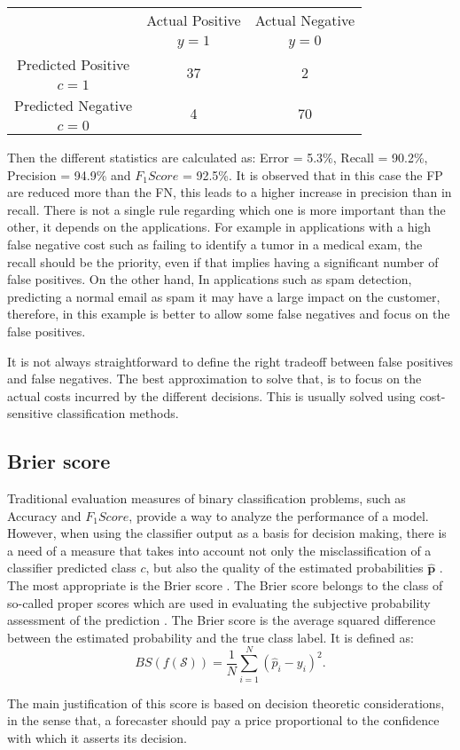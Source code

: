 \begin{center}
		\footnotesize
    \begin{tabular}{c|c|c}
			\multicolumn{1}{c|}{}  & Actual Positive& Actual Negative \\
			\multicolumn{1}{c|}{} & $y=1$& $y=0$ \\
			\hline
			Predicted Positive 		& \multirow{ 2}{*}{37} & \multirow{ 
			2}{*}{2} \\
			$c=1$ & &\\
			\hline
			Predicted Negative  	& \multirow{ 2}{*}{4} & \multirow{ 
			2}{*}{70} \\
			$c=0$ & &\\
		\end{tabular}
\end{center}
Then the different statistics are calculated as: Error = 5.3\%, Recall = 90.2\%, Precision = 
94.9\% and $F_1Score$ = 92.5\%.
It is observed that in this case the FP are reduced more than the FN, this leads to a higher 
increase in precision  than in recall. There is not a single rule regarding which one is more 
important than the other, it depends on the applications. For example in applications with a high 
false negative cost such as failing to identify a tumor in a medical exam, the recall should be the 
priority, even if that implies having a significant number of false positives. On the other hand, 
In applications such as spam detection, predicting a normal email as spam it may have a large 
impact on the customer, therefore, in this example is better to allow some false negatives and 
focus on the false positives.

It is not always straightforward  to define the right tradeoff between false positives 
and false negatives. The best approximation to solve that, is to focus on the actual costs incurred 
by the different decisions. This is usually solved using cost-sensitive classification methods. 

\subsection{Brier score}
\label{sec:2:brier}

Traditional evaluation measures of binary classification problems, such as Accuracy and 
$F_1Score$, provide a way to analyze the performance of a model. However, when using the classifier 
output as a basis for decision making, there is a need of a measure that takes into account not 
only the misclassification of a classifier predicted class $c$, but also the quality of the 
estimated probabilities $\mathbf{\hat p}$ \citep{cohen2004}. The most appropriate  is the Brier 
score \citep{brier1950}. The Brier score belongs to the class of so-called proper scores which are 
used in evaluating the subjective probability assessment of the prediction \citep{DeGroot1983}. The 
Brier score is the average squared difference between the estimated probability and the true class 
label. It is defined as:
\begin{equation}
  BS(f(\mathcal{S})) = \frac{1}{N} \sum_{i=1}^{N} (\hat p_i - y_i)^2.
\end{equation}

The main justification of this score is based on decision theoretic considerations, in the sense 
that, a forecaster should pay a price proportional to the confidence with which it asserts its 
decision.


\subsection*{}
